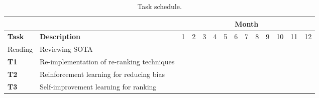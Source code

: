 %
\begin{table}[t!]
	\centering
	\scriptsize	
	\caption{Task schedule.}
	\begin{tabular}{|p{0.80cm}|p{4.80cm}|p{0.40cm}|p{0.40cm}|p{0.40cm}|p{0.40cm}|p{0.40cm}|p{0.40cm}|p{0.40cm}|p{0.40cm}|p{0.40cm}|p{0.40cm}|p{0.40cm}|p{0.40cm}|}  \hline
		& & \multicolumn{12}{c|}{\textbf{Month}} \\ \hline
		\textbf{Task} & \textbf{Description} & 1 & 2 & 3 & 4 & 5 & 6  & 7 & 8 & 9 &  10 & 11 & 12 \\ \hline
		Reading & Reviewing SOTA & \cellcolor{lightgray} & \cellcolor{lightgray} &  &  &  &   &  &  &  &   & \cellcolor{lightgray} &  \\ \hline
		\textbf{T1} & Re-implementation of re-ranking techniques &  & \cellcolor{lightgray} & \cellcolor{lightgray} &   &   &   &  &  &  &   &  &  \\ \hline
		\textbf{T2} & Reinforcement learning for reducing bias &  &  & \cellcolor{lightgray} & \cellcolor{lightgray} &  \cellcolor{lightgray} &  \cellcolor{lightgray}  &  &  &  &   &  &  \\ \hline
		\textbf{T3} & Self-improvement learning for ranking &  &  & \cellcolor{lightgray} & \cellcolor{lightgray} &  \cellcolor{lightgray} &  \cellcolor{lightgray}  &  &  &  &   &  &  \\ \hline

\end{tabular}
\end{table}
